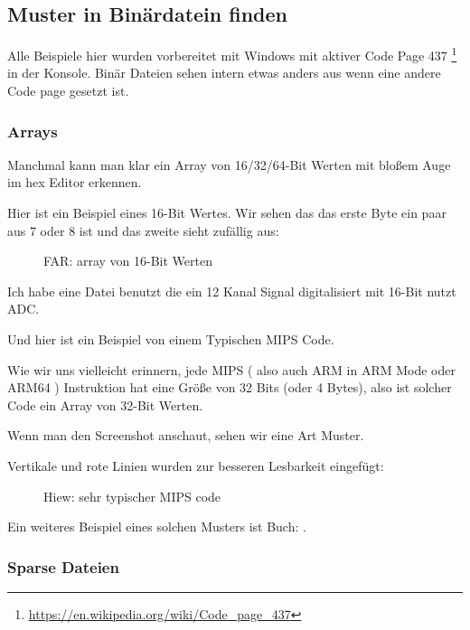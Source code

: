 
\subsection{ Muster in Binärdatein finden}

Alle Beispiele hier wurden vorbereitet mit Windows mit aktiver Code Page 437
\footnote{\url{https://en.wikipedia.org/wiki/Code_page_437}} in der Konsole.
Binär Dateien sehen intern etwas anders aus wenn eine andere Code page gesetzt ist.

\clearpage
\subsubsection{Arrays}

Manchmal kann man klar ein Array von 16/32/64-Bit Werten mit bloßem Auge im hex Editor erkennen.

Hier ist ein Beispiel eines 16-Bit Wertes.
Wir sehen das das erste Byte ein paar aus 7 oder 8 ist und das zweite sieht
zufällig aus:

\begin{figure}[H]
\centering
{}
\caption{FAR: array von 16-Bit Werten}
\end{figure}

Ich habe eine Datei benutzt die ein 12 Kanal Signal digitalisiert mit 16-Bit nutzt \ac{ADC}.

\clearpage
{}
\par Und hier ist ein Beispiel von einem Typischen MIPS Code.

Wie wir uns vielleicht erinnern, jede MIPS ( also auch ARM in ARM Mode oder ARM64 ) Instruktion hat eine Größe von 32 Bits (oder 4 Bytes),
also ist solcher Code ein Array von 32-Bit Werten. 

Wenn man den Screenshot anschaut, sehen wir eine Art Muster.

Vertikale und rote Linien wurden zur besseren Lesbarkeit eingefügt:

\begin{figure}[H]
\centering
{}
\caption{Hiew: sehr typischer MIPS code}
\end{figure}

Ein weiteres Beispiel eines solchen Musters ist Buch:
.

\clearpage
\subsubsection{Sparse Dateien} 

